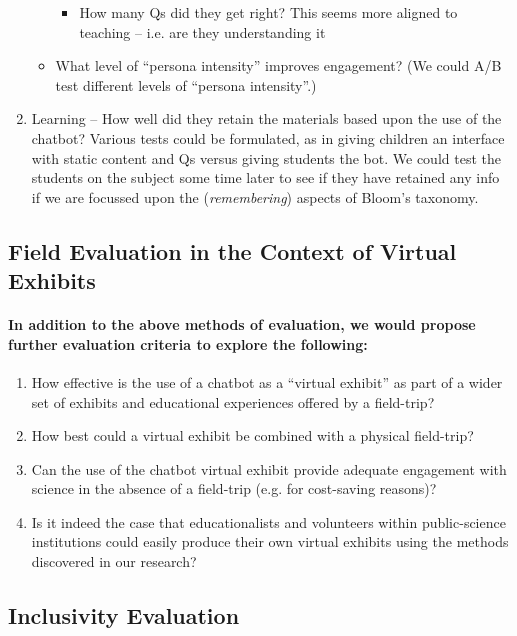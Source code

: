 \documentclass{article}
\begin{document}
\begin{enumerate}
\begin{itemize}
\begin{itemize}
            \item How many Qs did they get right? This seems more aligned to teaching – i.e. are they understanding it
        \end{itemize}
        \item What level of “persona intensity” improves engagement? (We could A/B test different levels of “persona intensity”.)
    \end{itemize}
    \item Learning – How well did they retain the materials based upon the use of the chatbot? Various tests could be formulated, as in giving children an interface with static content and Qs versus giving students the bot. We could test the students on the subject some time later to see if they have retained any info if we are focussed upon the (\textit{remembering}) aspects of Bloom’s taxonomy.
\end{enumerate}

\subsection*{Field Evaluation in the Context of Virtual Exhibits}

\paragraph{In addition to the above methods of evaluation, we would propose further evaluation criteria to explore the following:}

\begin{enumerate}
    \item How effective is the use of a chatbot as a “virtual exhibit” as part of a wider set of exhibits and educational experiences offered by a field-trip?
    \item How best could a virtual exhibit be combined with a physical field-trip?
    \item Can the use of the chatbot virtual exhibit provide adequate engagement with science in the absence of a field-trip (e.g. for cost-saving reasons)?
    \item Is it indeed the case that educationalists and volunteers within public-science institutions could easily produce their own virtual exhibits using the methods discovered in our research?
\end{enumerate}

\subsection*{Inclusivity Evaluation}
\end{document}
